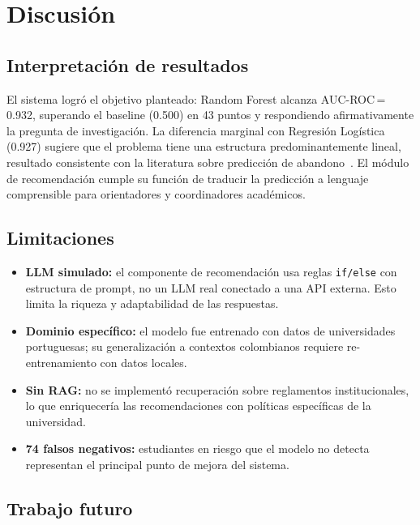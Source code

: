 \documentclass[10pt,twocolumn]{article}
\begin{document}
\section{Discusión}

\subsection{Interpretación de resultados}

El sistema logró el objetivo planteado: Random Forest alcanza
AUC-ROC\,=\,0.932, superando el baseline (0.500) en 43 puntos y
respondiendo afirmativamente la pregunta de investigación. La diferencia
marginal con Regresión Logística (0.927) sugiere que el problema tiene
una estructura predominantemente lineal, resultado consistente con la
literatura sobre predicción de abandono~\cite{martins2021}. El módulo
de recomendación cumple su función de traducir la predicción a lenguaje
comprensible para orientadores y coordinadores académicos.

\subsection{Limitaciones}

\begin{itemize}[leftmargin=*,topsep=2pt,itemsep=1pt]
  \item \textbf{LLM simulado:} el componente de recomendación usa reglas
        \texttt{if/else} con estructura de prompt, no un LLM real
        conectado a una API externa. Esto limita la riqueza y
        adaptabilidad de las respuestas.
  \item \textbf{Dominio específico:} el modelo fue entrenado con datos
        de universidades portuguesas; su generalización a contextos
        colombianos requiere re-entrenamiento con datos locales.
  \item \textbf{Sin RAG:} no se implementó recuperación sobre reglamentos
        institucionales, lo que enriquecería las recomendaciones con
        políticas específicas de la universidad.
  \item \textbf{74 falsos negativos:} estudiantes en riesgo que el modelo
        no detecta representan el principal punto de mejora del sistema.
\end{itemize}

\subsection{Trabajo futuro}
\end{document}
